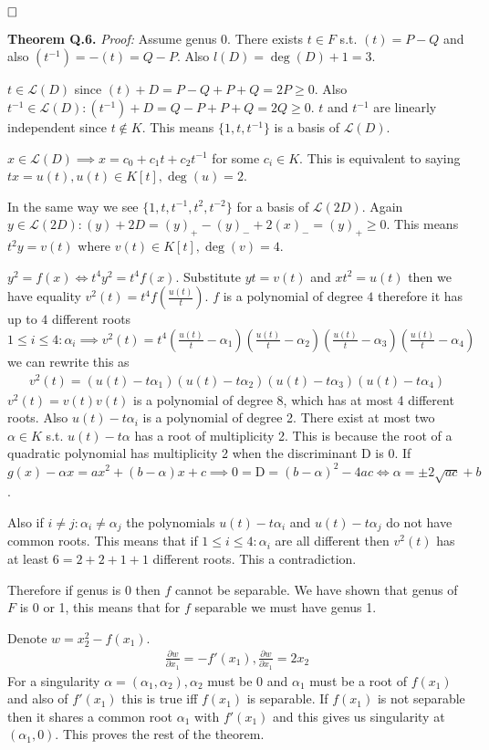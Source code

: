 \documentclass[12pt, a4paper]{article}
\newcommand{\qed}{\hfill\square}
\begin{document}
$\qed$


\textbf{Theorem Q.6.} \textit{Proof:}
Assume genus 0. There exists $t \in F$ s.t. $(t)=P-Q$ and also $(t^{-1})=-(t)=Q-P$. Also $l(D)=\deg(D)+1 = 3$. 

$t \in \mathcal{L}(D)$ since $(t)+D = P-Q+P+Q=2P \geq 0$. Also $t^{-1} \in \mathcal{L}(D): (t^{-1})+D=Q-P+P+Q = 2Q \geq 0$. $t$ and $t^{-1}$ are linearly independent since $t \notin K$. This means $\{1,t,t^{-1}\}$ is a basis of $\mathcal{L}(D)$.

$x \in \mathcal{L}(D) \implies x = c_0+c_1t+c_2t^{-1}$ for some $c_i \in K$. This is equivalent to saying $tx = u(t), u(t) \in K[t], \deg(u)=2$.

In the same way we see $\{1,t,t^{-1},t^2,t^{-2}\}$ for a basis of $\mathcal{L}(2D)$. Again $y \in \mathcal{L}(2D): (y) + 2D = (y)_{+} - (y)_{-} + 2(x)_{-} = (y)_{+} \geq 0$. This means $t^2y = v(t)$ where $v(t) \in K[t], \deg(v)=4$.

$y^2 = f(x) \iff t^4y^2=t^4f(x)$. Substitute $yt=v(t)$ and $xt^2=u(t)$ then we have equality $v^2(t)=t^4f(\frac{u(t)}{t})$. $f$ is a polynomial of degree $4$ therefore it has up to $4$ different roots $1 \leq i \leq 4: \alpha_i \implies v^2(t)=t^4(\frac{u(t)}{t}-\alpha_1)(\frac{u(t)}{t}-\alpha_2)(\frac{u(t)}{t}-\alpha_3)(\frac{u(t)}{t}-\alpha_4)$ we can rewrite this as 
\begin{gather*}
v^2(t)=(u(t)-t\alpha_1)(u(t)-t\alpha_2)(u(t)-t\alpha_3)(u(t)-t\alpha_4)
\end{gather*}
$v^2(t)=v(t)v(t)$ is a polynomial of degree $8$, which has at most 4 different roots. Also $u(t)-t\alpha_i$ is a polynomial of degree 2. There exist at most two $\alpha \in K$ s.t. $u(t)-t\alpha$ has a root of multiplicity 2. This is because the root of a quadratic polynomial has multiplicity 2 when the discriminant D is 0. If $g(x)-\alpha x=ax^2+(b-\alpha)x+c \implies 0 = \text{D} = (b-\alpha)^2-4ac \iff \alpha = \pm 2\sqrt{ac}+b$.

Also if $i\neq j: \alpha_i \neq \alpha_j$ the polynomials $u(t)-t\alpha_i$ and $u(t)-t\alpha_j$ do not have common roots. This means that if $1 \leq i \leq 4: \alpha_i$ are all different then $v^2(t)$ has at least $6 = 2+2+1+1$ different roots. This a contradiction.

Therefore if genus is $0$ then $f$ cannot be separable. We have shown that genus of $F$ is 0 or 1, this means that for $f$ separable we must have genus 1.

Denote $w=x_2^2-f(x_1)$.
\begin{gather}
\frac{\partial w}{\partial x_1} = -f'(x_1), \frac{\partial w}{\partial x_1} = 2x_2
\end{gather}
For a singularity $\alpha = (\alpha_1, \alpha_2), \alpha_2$ must be $0$ and $\alpha_1$ must be a root of $f(x_1)$ and also of $f'(x_1)$ this is true iff $f(x_1)$ is separable. If $f(x_1)$ is not separable then it shares a common root $\alpha_1$ with $f'(x_1)$ and this gives us singularity at $(\alpha_1, 0)$. This proves the rest of the theorem.
\end{document}
